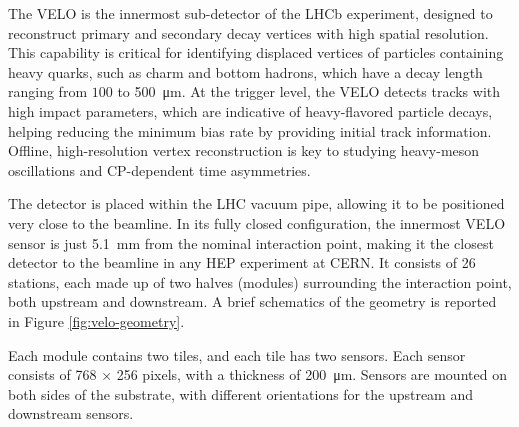 The VELO is the innermost sub-detector of the LHCb experiment, designed to reconstruct primary and secondary decay vertices with high spatial resolution. This capability is critical for identifying displaced vertices of particles containing heavy quarks, such as charm and bottom hadrons, which have a decay length ranging from $100$ to \SI{500}{\micro\meter}. At the trigger level, the VELO detects tracks with high impact parameters, which are indicative of heavy-flavored particle decays, helping reducing the minimum bias rate by providing initial track information. Offline, high-resolution vertex reconstruction is key to studying heavy-meson oscillations and CP-dependent time asymmetries.

The detector is placed within the LHC vacuum pipe, allowing it to be positioned very close to the beamline. In its fully closed configuration, the innermost VELO sensor is just \SI{5.1}{\milli\meter} from the nominal interaction point, making it the closest detector to the beamline in any HEP experiment at CERN.
It consists of 26 stations, each made up of two halves (modules) surrounding the interaction point, both upstream and downstream. A brief schematics of the geometry is reported in Figure \ref{fig:velo-geometry}\cite{LHCbVelo:2019flq}.

Each module contains two tiles, and each tile has two sensors. Each sensor consists of 768 × 256 pixels, with a thickness of \SI{200}{\micro\meter}. Sensors are mounted on both sides of the substrate, with different orientations for the upstream and downstream sensors. 

